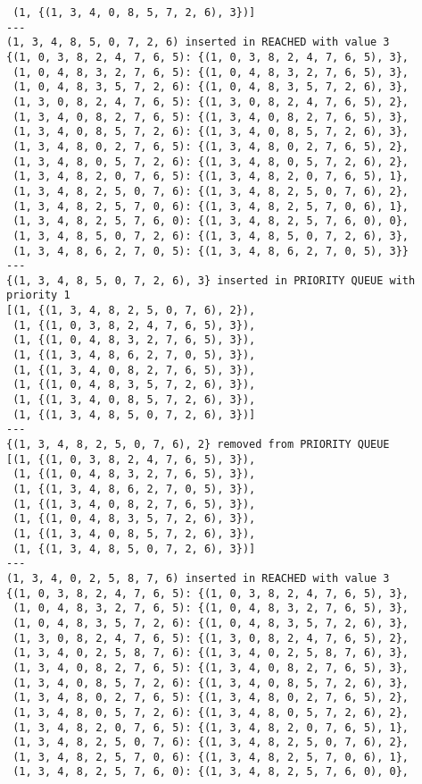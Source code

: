 \documentclass{article}
\begin{document}
\begin{verbatim}
 (1, {(1, 3, 4, 0, 8, 5, 7, 2, 6), 3})]
---
(1, 3, 4, 8, 5, 0, 7, 2, 6) inserted in REACHED with value 3
{(1, 0, 3, 8, 2, 4, 7, 6, 5): {(1, 0, 3, 8, 2, 4, 7, 6, 5), 3},
 (1, 0, 4, 8, 3, 2, 7, 6, 5): {(1, 0, 4, 8, 3, 2, 7, 6, 5), 3},
 (1, 0, 4, 8, 3, 5, 7, 2, 6): {(1, 0, 4, 8, 3, 5, 7, 2, 6), 3},
 (1, 3, 0, 8, 2, 4, 7, 6, 5): {(1, 3, 0, 8, 2, 4, 7, 6, 5), 2},
 (1, 3, 4, 0, 8, 2, 7, 6, 5): {(1, 3, 4, 0, 8, 2, 7, 6, 5), 3},
 (1, 3, 4, 0, 8, 5, 7, 2, 6): {(1, 3, 4, 0, 8, 5, 7, 2, 6), 3},
 (1, 3, 4, 8, 0, 2, 7, 6, 5): {(1, 3, 4, 8, 0, 2, 7, 6, 5), 2},
 (1, 3, 4, 8, 0, 5, 7, 2, 6): {(1, 3, 4, 8, 0, 5, 7, 2, 6), 2},
 (1, 3, 4, 8, 2, 0, 7, 6, 5): {(1, 3, 4, 8, 2, 0, 7, 6, 5), 1},
 (1, 3, 4, 8, 2, 5, 0, 7, 6): {(1, 3, 4, 8, 2, 5, 0, 7, 6), 2},
 (1, 3, 4, 8, 2, 5, 7, 0, 6): {(1, 3, 4, 8, 2, 5, 7, 0, 6), 1},
 (1, 3, 4, 8, 2, 5, 7, 6, 0): {(1, 3, 4, 8, 2, 5, 7, 6, 0), 0},
 (1, 3, 4, 8, 5, 0, 7, 2, 6): {(1, 3, 4, 8, 5, 0, 7, 2, 6), 3},
 (1, 3, 4, 8, 6, 2, 7, 0, 5): {(1, 3, 4, 8, 6, 2, 7, 0, 5), 3}}
---
{(1, 3, 4, 8, 5, 0, 7, 2, 6), 3} inserted in PRIORITY QUEUE with priority 1
[(1, {(1, 3, 4, 8, 2, 5, 0, 7, 6), 2}),
 (1, {(1, 0, 3, 8, 2, 4, 7, 6, 5), 3}),
 (1, {(1, 0, 4, 8, 3, 2, 7, 6, 5), 3}),
 (1, {(1, 3, 4, 8, 6, 2, 7, 0, 5), 3}),
 (1, {(1, 3, 4, 0, 8, 2, 7, 6, 5), 3}),
 (1, {(1, 0, 4, 8, 3, 5, 7, 2, 6), 3}),
 (1, {(1, 3, 4, 0, 8, 5, 7, 2, 6), 3}),
 (1, {(1, 3, 4, 8, 5, 0, 7, 2, 6), 3})]
---
{(1, 3, 4, 8, 2, 5, 0, 7, 6), 2} removed from PRIORITY QUEUE
[(1, {(1, 0, 3, 8, 2, 4, 7, 6, 5), 3}),
 (1, {(1, 0, 4, 8, 3, 2, 7, 6, 5), 3}),
 (1, {(1, 3, 4, 8, 6, 2, 7, 0, 5), 3}),
 (1, {(1, 3, 4, 0, 8, 2, 7, 6, 5), 3}),
 (1, {(1, 0, 4, 8, 3, 5, 7, 2, 6), 3}),
 (1, {(1, 3, 4, 0, 8, 5, 7, 2, 6), 3}),
 (1, {(1, 3, 4, 8, 5, 0, 7, 2, 6), 3})]
---
(1, 3, 4, 0, 2, 5, 8, 7, 6) inserted in REACHED with value 3
{(1, 0, 3, 8, 2, 4, 7, 6, 5): {(1, 0, 3, 8, 2, 4, 7, 6, 5), 3},
 (1, 0, 4, 8, 3, 2, 7, 6, 5): {(1, 0, 4, 8, 3, 2, 7, 6, 5), 3},
 (1, 0, 4, 8, 3, 5, 7, 2, 6): {(1, 0, 4, 8, 3, 5, 7, 2, 6), 3},
 (1, 3, 0, 8, 2, 4, 7, 6, 5): {(1, 3, 0, 8, 2, 4, 7, 6, 5), 2},
 (1, 3, 4, 0, 2, 5, 8, 7, 6): {(1, 3, 4, 0, 2, 5, 8, 7, 6), 3},
 (1, 3, 4, 0, 8, 2, 7, 6, 5): {(1, 3, 4, 0, 8, 2, 7, 6, 5), 3},
 (1, 3, 4, 0, 8, 5, 7, 2, 6): {(1, 3, 4, 0, 8, 5, 7, 2, 6), 3},
 (1, 3, 4, 8, 0, 2, 7, 6, 5): {(1, 3, 4, 8, 0, 2, 7, 6, 5), 2},
 (1, 3, 4, 8, 0, 5, 7, 2, 6): {(1, 3, 4, 8, 0, 5, 7, 2, 6), 2},
 (1, 3, 4, 8, 2, 0, 7, 6, 5): {(1, 3, 4, 8, 2, 0, 7, 6, 5), 1},
 (1, 3, 4, 8, 2, 5, 0, 7, 6): {(1, 3, 4, 8, 2, 5, 0, 7, 6), 2},
 (1, 3, 4, 8, 2, 5, 7, 0, 6): {(1, 3, 4, 8, 2, 5, 7, 0, 6), 1},
 (1, 3, 4, 8, 2, 5, 7, 6, 0): {(1, 3, 4, 8, 2, 5, 7, 6, 0), 0},

\end{verbatim}
\end{document}
